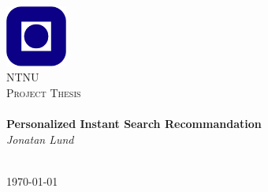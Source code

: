 \begin{titlepage}
\begin{center}
\includegraphics[width=0.15\textwidth]{img/NTNU.png}~\\[1cm]

\textsc{\LARGE NTNU}\\[1.5cm]

\textsc{\Large Project Thesis}\\[0.5cm]

\HRule \\[0.4cm]
{ \huge \bfseries Personalized Instant Search Recommandation}\\[0.5cm]
{\large \textit{Jonatan Lund}}\\[0.2cm]
\HRule \\[1.5cm]



\vfill

{\large \today}
\end{center}
\end{titlepage}
